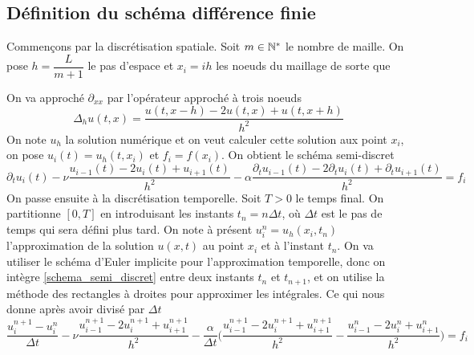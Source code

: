 \subsection{Définition du schéma différence finie}
Commençons par la discrétisation spatiale. Soit $m \in \mathbb{N}^*$ le nombre de maille. On pose $h = \dfrac{L}{m+1}$ le pas d'espace et $x_i = ih$ les noeuds du maillage de sorte que
\begin{center}
\end{center}
On va approché $\partial_{xx}$ par l'opérateur approché à trois noeuds
\begin{equation*}
    \Delta_hu(t,x) = \frac{u(t,x-h)-2u(t,x)+u(t,x+h)}{h^2}
\end{equation*}
On note $u_h$ la solution numérique et on veut calculer cette solution aux point $x_i$, on pose $u_i(t)=u_h(t,x_i)$ et $f_i=f(x_i)$. On obtient le schéma semi-discret
\begin{equation}\label{schema_semi_discret}
    \partial_tu_i(t)-\nu\frac{u_{i-1}(t)-2u_i(t)+u_{i+1}(t)}{h^2}-\alpha\frac{\partial_tu_{i-1}(t)-2\partial_tu_i(t)+\partial_tu_{i+1}(t)}{h^2}=f_i
\end{equation}
On passe ensuite à la discrétisation temporelle. Soit $T>0$ le temps final. On partitionne $[0,T]$ en introduisant les instants $t_n = n \Delta t$, où $\Delta t$ est le pas de temps qui sera défini plus tard. On note à présent $u_i^n=u_h(x_i,t_n)$ l'approximation de la solution $u(x,t)$ au point $x_i$ et à l'instant $t_n$. On va utiliser le schéma d'Euler implicite pour l'approximation temporelle, donc on intègre \eqref{schema_semi_discret} entre deux instants $t_n$ et $t_{n+1}$, et on utilise la méthode des rectangles à droites pour approximer les intégrales. Ce qui nous donne après avoir divisé par $\Delta t$
\begin{equation}\label{schema_DF_points}
    \frac{u_i^{n+1}-u_i^n}{\Delta t} - \nu \frac{u_{i-1}^{n+1}-2u_i^{n+1}+u_{i+1}^{n+1}}{h^2} - \frac{\alpha}{\Delta t}\bigg( \frac{u_{i-1}^{n+1}-2u_i^{n+1}+u_{i+1}^{n+1}}{h^2}-\frac{u_{i-1}^{n}-2u_i^{n}+u_{i+1}^{n}}{h^2}\bigg) = f_i
\end{equation}
